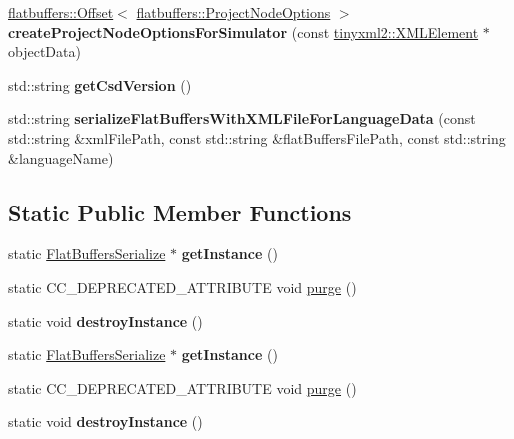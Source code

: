 \begin{DoxyCompactItemize}
\item 
\mbox{\label{classcocostudio_1_1FlatBuffersSerialize_a01b9eb9a278942c86cbf3ad63b87ddd4}} 
\hyperlink{structflatbuffers_1_1Offset}{flatbuffers\+::\+Offset}$<$ \hyperlink{structflatbuffers_1_1ProjectNodeOptions}{flatbuffers\+::\+Project\+Node\+Options} $>$ {\bfseries create\+Project\+Node\+Options\+For\+Simulator} (const \hyperlink{classtinyxml2_1_1XMLElement}{tinyxml2\+::\+X\+M\+L\+Element} $\ast$object\+Data)
\item 
\mbox{\label{classcocostudio_1_1FlatBuffersSerialize_a110fd8a70a750c02faba8a703ebf5dbc}} 
std\+::string {\bfseries get\+Csd\+Version} ()
\item 
\mbox{\label{classcocostudio_1_1FlatBuffersSerialize_affeee23693903480f08033deb0b2c480}} 
std\+::string {\bfseries serialize\+Flat\+Buffers\+With\+X\+M\+L\+File\+For\+Language\+Data} (const std\+::string \&xml\+File\+Path, const std\+::string \&flat\+Buffers\+File\+Path, const std\+::string \&language\+Name)
\end{DoxyCompactItemize}
\subsection*{Static Public Member Functions}
\begin{DoxyCompactItemize}
\item 
\mbox{\label{classcocostudio_1_1FlatBuffersSerialize_ab66cf77855a661cc0deeb9f51cfbfea9}} 
static \hyperlink{classcocostudio_1_1FlatBuffersSerialize}{Flat\+Buffers\+Serialize} $\ast$ {\bfseries get\+Instance} ()
\item 
static C\+C\+\_\+\+D\+E\+P\+R\+E\+C\+A\+T\+E\+D\+\_\+\+A\+T\+T\+R\+I\+B\+U\+TE void \hyperlink{classcocostudio_1_1FlatBuffersSerialize_ab01f64a6294feee2ebcbedc52a32ef14}{purge} ()
\item 
\mbox{\label{classcocostudio_1_1FlatBuffersSerialize_a7096f8f293105bb5826972099cf7c067}} 
static void {\bfseries destroy\+Instance} ()
\item 
\mbox{\label{classcocostudio_1_1FlatBuffersSerialize_aa87e8996e24a1cd7dd3a34c57c1d1a24}} 
static \hyperlink{classcocostudio_1_1FlatBuffersSerialize}{Flat\+Buffers\+Serialize} $\ast$ {\bfseries get\+Instance} ()
\item 
static C\+C\+\_\+\+D\+E\+P\+R\+E\+C\+A\+T\+E\+D\+\_\+\+A\+T\+T\+R\+I\+B\+U\+TE void \hyperlink{classcocostudio_1_1FlatBuffersSerialize_a3f15e475b6ff17343f4b7acf75d503b5}{purge} ()
\item 
\mbox{\label{classcocostudio_1_1FlatBuffersSerialize_ada0a0c424053a386580c45a6e55c0572}} 
static void {\bfseries destroy\+Instance} ()
\end{DoxyCompactItemize}
